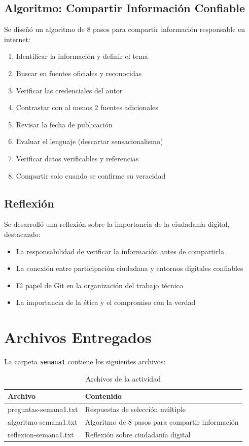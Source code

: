\documentclass[12pt,a4paper]{article}
\begin{document}
\subsection{Algoritmo: Compartir Información Confiable}

Se diseñó un algoritmo de 8 pasos para compartir información responsable en internet:

\begin{enumerate}
    \item Identificar la información y definir el tema
    \item Buscar en fuentes oficiales y reconocidas
    \item Verificar las credenciales del autor
    \item Contrastar con al menos 2 fuentes adicionales
    \item Revisar la fecha de publicación
    \item Evaluar el lenguaje (descartar sensacionalismo)
    \item Verificar datos verificables y referencias
    \item Compartir solo cuando se confirme su veracidad
\end{enumerate}

\subsection{Reflexión}

Se desarrolló una reflexión sobre la importancia de la ciudadanía digital, destacando:

\begin{itemize}
    \item La responsabilidad de verificar la información antes de compartirla
    \item La conexión entre participación ciudadana y entornos digitales confiables
    \item El papel de Git en la organización del trabajo técnico
    \item La importancia de la ética y el compromiso con la verdad
\end{itemize}

\section{Archivos Entregados}

La carpeta \texttt{semana1} contiene los siguientes archivos:

\begin{table}[h]
\centering
\begin{tabular}{|l|l|}
\hline
\textbf{Archivo} & \textbf{Contenido} \\
\hline
preguntas-semana1.txt & Respuestas de selección múltiple \\
\hline
algoritmo-semana1.txt & Algoritmo de 8 pasos para compartir información \\
\hline
reflexion-semana1.txt & Reflexión sobre ciudadanía digital \\
\hline
\end{tabular}
\caption{Archivos de la actividad}
\end{table}
\end{document}
